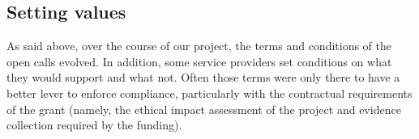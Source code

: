 \subsection{Setting values}\label{setting-values}

As said above, over the course of our project, the terms and conditions
of the open calls evolved. In addition, some service providers set conditions
on what they would support and what not. Often those terms were only
there to have a better lever to enforce compliance, particularly with
the contractual requirements of the grant (namely, the ethical impact
assessment of the project and evidence collection required by the funding).